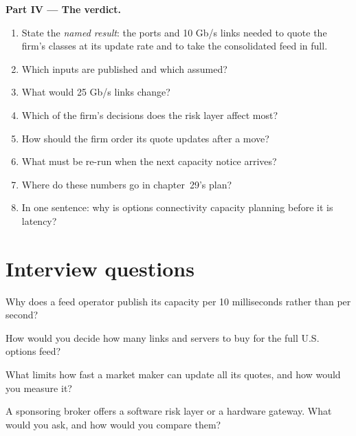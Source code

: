 \begin{problem}
\medskip\noindent\textbf{Part IV --- The verdict.}
\begin{enumerate}[resume]
\item State the \emph{named result}: the ports and 10 Gb/s links needed to quote the firm's classes at its update rate and to take
  the consolidated feed in full.
\item Which inputs are published and which assumed?
\item What would 25 Gb/s links change?
\item Which of the firm's decisions does the risk layer affect most?
\item How should the firm order its quote updates after a move?
\item What must be re-run when the next capacity notice arrives?
\item Where do these numbers go in chapter~29's plan?
\item In one sentence: why is options connectivity capacity planning before it is latency?
\end{enumerate}
\end{problem}

\section{Interview questions}

\begin{interviewq}\label{iq:nw:equities-and-options-connectivity:1}
Why does a feed operator publish its capacity per 10 milliseconds rather than per second?
\end{interviewq}

\begin{interviewq}\label{iq:nw:equities-and-options-connectivity:2}
How would you decide how many links and servers to buy for the full U.S. options feed?
\end{interviewq}

\begin{interviewq}\label{iq:nw:equities-and-options-connectivity:3}
What limits how fast a market maker can update all its quotes, and how would you measure it?
\end{interviewq}

\begin{interviewq}\label{iq:nw:equities-and-options-connectivity:4}
A sponsoring broker offers a software risk layer or a hardware gateway. What would you ask, and how would you compare them?
\end{interviewq}

